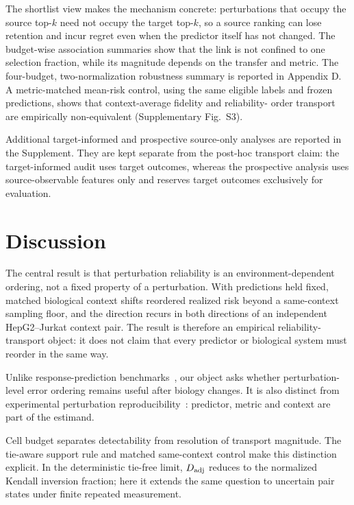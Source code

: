 \documentclass{article}
\begin{document}
The shortlist view makes the mechanism concrete: perturbations that occupy the
source top-$k$ need not occupy the target top-$k$, so a source ranking can lose
retention and incur regret even when the predictor itself has not changed. The
budget-wise association summaries show that the link is not confined to one
selection fraction, while its magnitude depends on the transfer and metric.
The four-budget, two-normalization robustness summary is reported in
Appendix D. A metric-matched mean-risk control, using the same eligible labels
and frozen predictions, shows that context-average fidelity and reliability-
order transport are empirically non-equivalent (Supplementary Fig.~S3).

Additional target-informed and prospective source-only analyses are reported in
the Supplement. They are kept separate from the post-hoc transport claim: the
target-informed audit uses target outcomes, whereas the prospective analysis
uses source-observable features only and reserves target outcomes exclusively
for evaluation.

\FloatBarrier
\section{Discussion}
The central result is that perturbation reliability is an environment-dependent
ordering, not a fixed property of a perturbation. With predictions held fixed,
matched biological context shifts reordered realized risk beyond a same-context
sampling floor, and the direction recurs in both directions of an independent
HepG2--Jurkat context pair. The result is therefore an empirical
reliability-transport object: it does not claim that every predictor or
biological system must reorder in the same way.

Unlike response-prediction benchmarks~\citep{lotfollahi2019scgen,
lotfollahi2023cpa,bunne2023cellot,roohani2023gears,cui2024scgpt,
generalizable2025benchmark}, our object asks whether perturbation-level error
ordering remains useful after biology changes. It is also distinct from
experimental perturbation reproducibility~\citep{wang2026reliable}: predictor,
metric and context are part of the estimand.

Cell budget separates detectability from resolution of transport magnitude.
The tie-aware support rule and matched same-context control make this distinction
explicit. In the deterministic tie-free limit, $D_{\rm adj}$ reduces to the
normalized Kendall inversion fraction; here it extends the same question to
uncertain pair states under finite repeated measurement.
\end{document}

